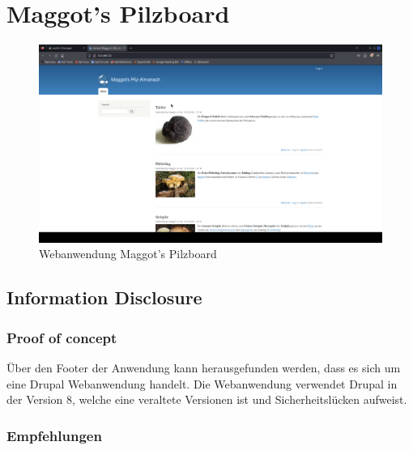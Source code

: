 \pagebreak
\chapter{Maggot's Pilzboard}

\vfill
\begin{figure}[!ht]
    \centering
    \includegraphics[width=\linewidth]{images/screenshots/07_pilzboard.png}
    \caption{Webanwendung Maggot's Pilzboard}
    \label{fig:05_pilzboard}
\end{figure}
\vfill
\newpage


\section{\makecvssbadge Information Disclosure}

\subsection*{Proof of concept}
Über den Footer der Anwendung kann herausgefunden werden, dass es sich um eine Drupal Webanwendung handelt. Die Webanwendung verwendet Drupal in der Version 8, welche eine veraltete Versionen ist und Sicherheitslücken aufweist.

\subsection*{Empfehlungen}


